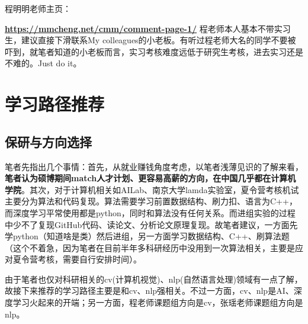 \documentclass[12pt, a4paper, fontset=ubuntu]{ctexart}
\begin{document}
\par 程明明老师主页：{\textbf{\url{https://mmcheng.net/cmm/comment-page-1/}}
程老师本人基本不带实习生，建议直接下滑联系My colleagues的小老板。有听过程老师大名的同学不要被吓到，就笔者知道的小老板而言，实习考核难度远低于研究生考核，进去实习还是不难的。Just do it。
\section{学习路径推荐}

\subsection{保研与方向选择}
笔者先指出几个事情：首先，从就业赚钱角度考虑，以笔者浅薄见识的了解来看，\textbf{笔者认为硕博期间match人才计划、更容易高薪的方向，在中国几乎都在计算机学院}。其次，对于计算机相关如AILab、南京大学lamda实验室，夏令营考核机试主要分为算法和代码复现。算法需要学习前置数据结构、刷力扣、语言为C++，而深度学习平常使用都是python，同时和算法没有任何关系。而进组实验的过程中少不了复现GitHub代码、读论文、分析论文原理复现。故笔者建议，一方面先学python（知道啥是类）然后进组，另一方面学习数据结构、C++、刷算法题（这个不着急，因为笔者在目前半年多科研经历中没用到一次算法相关，主要是应对夏令营考核，需要自行安排时间）。
\par 由于笔者也仅对科研相关的cv(计算机视觉)、nlp(自然语言处理)领域有一点了解，故接下来推荐的学习路径主要是和cv、nlp强相关。不过一方面，cv、nlp是AI、深度学习火起来的开端；另一方面，程老师课题组方向是cv，张瑶老师课题组方向是nlp。
}
\end{document}
